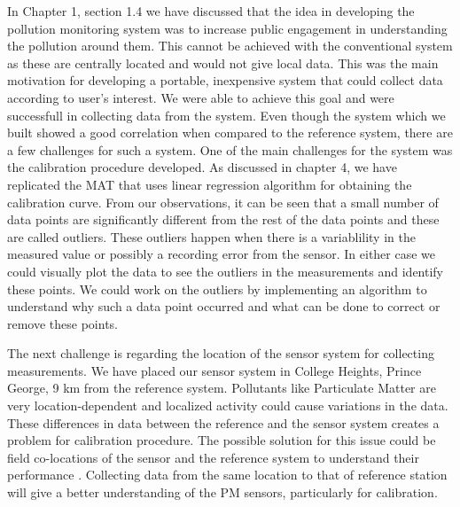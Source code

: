 In Chapter 1, section 1.4 we have discussed that the idea in developing the pollution monitoring system was to increase public engagement in understanding the pollution around them. This cannot be achieved with the conventional system as these are centrally located and would not give local data. This was the main motivation for developing a portable, inexpensive system that could collect data according to user's interest. We were able to achieve this goal and were successfull in collecting data from the system. Even though the system which we built showed a good correlation when compared to the reference system, there are a few challenges for such a system. One of the main challenges for the system was the calibration procedure developed. As discussed in chapter 4, we have replicated the MAT \cite{airsensortoolbox} that uses linear regression algorithm for obtaining the calibration curve. From our observations, it can be seen that a small number of data points are significantly different from the rest of the data points and these are called outliers. These outliers happen when there is a variablility in the measured value or possibly a recording error from the sensor. In either case we could visually plot the data to see the outliers in the measurements and identify these points. We could work on the outliers by implementing an algorithm to understand why such a data point occurred and what can be done to correct or remove these points. %

The next challenge is regarding the location of the sensor system for collecting measurements. We have placed our sensor system in College Heights, Prince George, 9 km from the reference system. Pollutants like Particulate Matter are very location-dependent and localized activity could cause variations in the data. These differences in data between the reference and the sensor system creates a problem for calibration procedure. The possible solution for this issue could be field co-locations of the sensor and the reference system to understand their performance \cite{austin2015laboratory}. Collecting data from the same location to that of reference station will give a better understanding of the PM sensors, particularly for calibration. 




